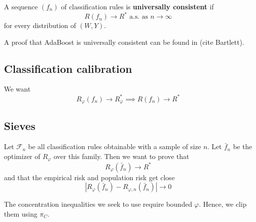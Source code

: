 A sequence $(f_n)$ of classification rules is \textbf{universally consistent} if
\begin{equation}
	\label{eq:universally_consistent}
	R(f_n) \to R^* \text{ a.s. as } n \to \infty
\end{equation}
for every distribution of $(W, Y)$.

A proof that AdaBoost is universally consistent can be found in (cite Bartlett).

\subsection{Classification calibration}
We want
\begin{equation*}
	R_\varphi (f_n) \to R^*_\varphi \implies R(f_n) \to R^*
\end{equation*}

\subsection{Sieves}
Let $\mathcal{F}_n$ be all classification rules obtainable with a sample of size $n$. Let $\bar{f}_n$ be the optimizer of $R_\varphi$ over this family. Then we want to prove that
\begin{equation}
	R_\varphi(\bar{f}_n) \to R^*
\end{equation}
and that the empirical risk and population risk get close
\begin{equation}
	|R_\varphi(\bar{f}_n) - R_{\varphi, n}(\bar{f}_n)| \to 0
\end{equation}

The concentration inequalities we seek to use require bounded $\varphi$. Hence, we clip them using $\pi_C$.
